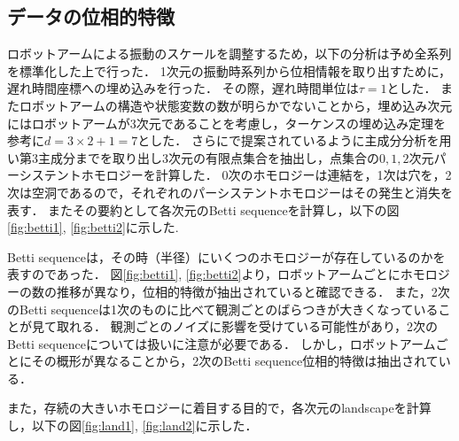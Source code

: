 \documentclass{jarticle}
\begin{document}
\subsection{データの位相的特徴}
ロボットアームによる振動のスケールを調整するため，以下の分析は予め全系列を標準化した上で行った．
1次元の振動時系列から位相情報を取り出すために，遅れ時間座標への埋め込みを行った．
その際，遅れ時間単位は$\tau = 1$とした．
またロボットアームの構造や状態変数の数が明らかでないことから，埋め込み次元にはロボットアームが3次元であることを考慮し，ターケンスの埋め込み定理\cite{Takens1981}を参考に$d = 3\times2 + 1 = 7$とした．
さらに\cite{Truong2017}で提案されているように主成分分析を用い第3主成分までを取り出し3次元の有限点集合を抽出し，点集合の$0,1,2$次元パーシステントホモロジーを計算した．
0次のホモロジーは連結を，1次は穴を，2次は空洞であるので，それぞれのパーシステントホモロジーはその発生と消失を表す．
またその要約として各次元のBetti sequenceを計算し，以下の図\ref{fig:betti1}, \ref{fig:betti2}に示した.

Betti sequenceは，その時（半径）にいくつのホモロジーが存在しているのかを表すのであった．
図\ref{fig:betti1}, \ref{fig:betti2}より，ロボットアームごとにホモロジーの数の推移が異なり，位相的特徴が抽出されていると確認できる．
また，2次のBetti sequenceは1次のものに比べて観測ごとのばらつきが大きくなっていることが見て取れる．
観測ごとのノイズに影響を受けている可能性があり，2次のBetti sequenceについては扱いに注意が必要である．
しかし，ロボットアームごとにその概形が異なることから，2次のBetti sequence位相的特徴は抽出されている．

また，存続の大きいホモロジーに着目する目的で，各次元のlandscapeを計算し，以下の図\ref{fig:land1}, \ref{fig:land2}に示した．
\end{document}
